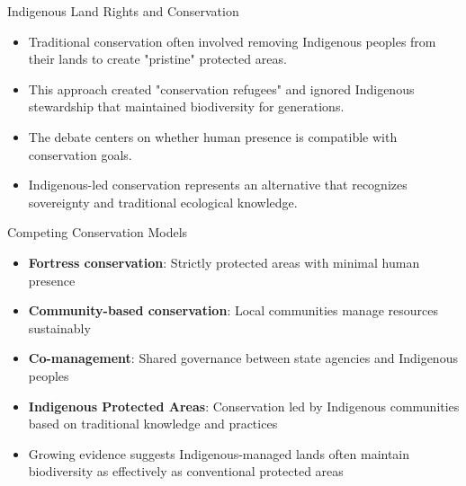 \documentclass{beamer}
\begin{document}
	\begin{frame}{Indigenous Land Rights and Conservation}
		\begin{itemize}
			\item Traditional conservation often involved removing Indigenous peoples from their lands to create "pristine" protected areas.
			\item This approach created "conservation refugees" and ignored Indigenous stewardship that maintained biodiversity for generations.
			\item The debate centers on whether human presence is compatible with conservation goals.
			\item Indigenous-led conservation represents an alternative that recognizes sovereignty and traditional ecological knowledge.
		\end{itemize}
		
		\begin{block}{Competing Conservation Models}
			\scriptsize
			\begin{itemize}
				\item \textbf{Fortress conservation}: Strictly protected areas with minimal human presence
				\item \textbf{Community-based conservation}: Local communities manage resources sustainably
				\item \textbf{Co-management}: Shared governance between state agencies and Indigenous peoples
				\item \textbf{Indigenous Protected Areas}: Conservation led by Indigenous communities based on traditional knowledge and practices
				\item Growing evidence suggests Indigenous-managed lands often maintain biodiversity as effectively as conventional protected areas
			\end{itemize}
		\end{block}
	\end{frame}
	
\end{document}
